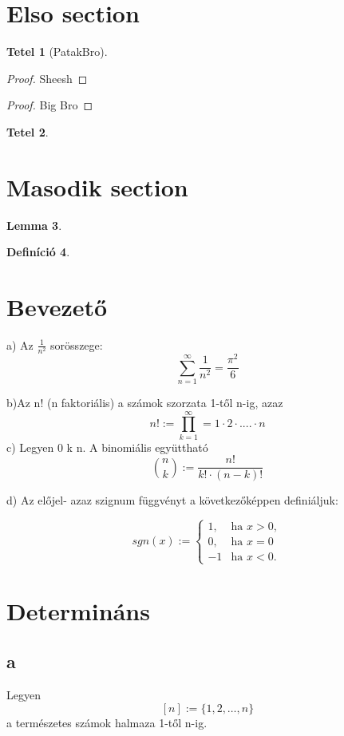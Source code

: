 \documentclass{article}
\newtheorem{tet}{Tetel}
\newtheorem{lemma}[tet]{Lemma}
\newtheorem{defin}[tet]{Definíció}
\begin{document}
\section{Elso section}
\begin{tet}[PatakBro]
\lipsum[1]
\end{tet}
\begin{proof}
Sheesh
\end{proof}
\begin{proof}
Big Bro
\end{proof}
\begin{tet}
\lipsum[1]
\end{tet}

\section{Masodik section}

\begin{lemma}
\lipsum[1]
\end{lemma}

\begin{defin}
\lipsum[1]
\end{defin}

\section{Bevezető}

a) Az $\frac{1}{n^2}$ sorösszege:
\[ \sum_{n=1}^\infty \frac{1}{n^2}
= \frac{\pi^2}{6} \]

b)Az n! (n faktoriális) a számok szorzata 1-től n-ig, azaz
\[ n!:=\prod_{k=1}^\infty = 1\cdot 2 \cdot....\cdot n  \]
c) Legyen 0  k  n. A binomiális együttható
\[\binom{n}{k}:= \frac{n!}{k!\cdot(n-k)!}\]

d) Az előjel- azaz szignum függvényt a következőképpen definiáljuk:

\[ sgn(x):=\begin{cases}
1, & \text{ha } x > 0, \\
0, & \text{ha } x = 0 \\ 
-1 & \text{ha } x < 0. \end{cases} \]


\section{Determináns}
\subsection{a}
Legyen\[[n]:=\{1, 2, \ldots, n\}\] a természetes számok halmaza 1-től n-ig.
 
\end{document}
